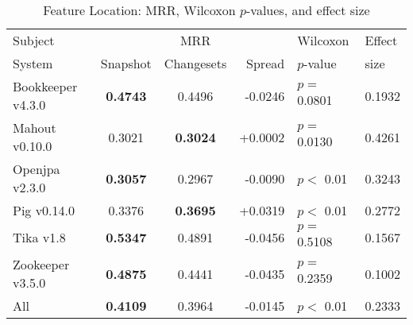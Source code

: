 \begin{table}[t]
\centering
\caption{Feature Location: MRR, Wilcoxon $p$-values, and effect size}
\begin{tabular}{l|ccr|ll}
\toprule
Subject & & MRR & & Wilcoxon & Effect \\
System  &  Snapshot & Changesets & Spread & $p$-value & size \\
\midrule
Bookkeeper v4.3.0 & {\bf 0.4743 } & 0.4496 & -0.0246 & $p = $ 0.0801 & 0.1932 \\
Mahout v0.10.0 & 0.3021 & {\bf 0.3024 } & +0.0002 & $p = $ 0.0130 & 0.4261 \\
Openjpa v2.3.0 & {\bf 0.3057 } & 0.2967 & -0.0090 & $p < $ 0.01 & 0.3243 \\
Pig v0.14.0 & 0.3376 & {\bf 0.3695 } & +0.0319 & $p < $ 0.01 & 0.2772 \\
Tika v1.8 & {\bf 0.5347 } & 0.4891 & -0.0456 & $p = $ 0.5108 & 0.1567 \\
Zookeeper v3.5.0 & {\bf 0.4875 } & 0.4441 & -0.0435 & $p = $ 0.2359 & 0.1002 \\
\midrule
All & {\bf 0.4109 } & 0.3964 & -0.0145 & $p < $ 0.01 & 0.2333 \\
\bottomrule
\end{tabular}
\label{table:feature_location_rq1}
\end{table}
